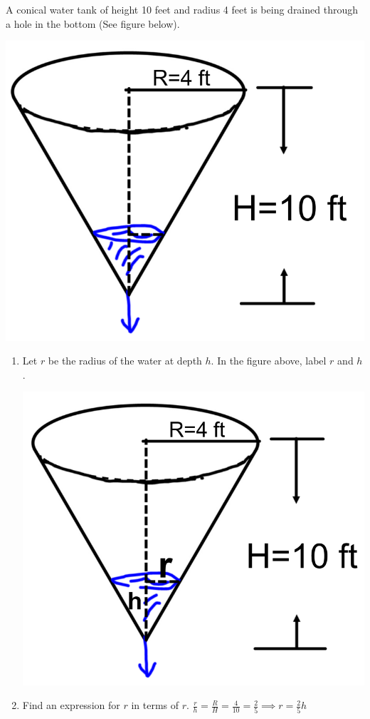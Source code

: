 \documentclass[nooutcomes]{ximera}
\begin{document}
\begin{problem}
A conical water tank of height 10 feet and radius 4 feet is being drained through a hole in the bottom (See figure below).   
		\begin{image}
		\includegraphics[scale=.4]{Figure14.png}
		\end{image}

\begin{enumerate}
	\item Let $r$ be the radius of the water at depth $h$.  In the figure above, label $r$ and $h$.
		\begin{freeResponse} \hfil
		\begin{image}
		\includegraphics[scale=.3]{Figure15.png}
		\end{image}
		\end{freeResponse}	
	\item Find an expression for $r$ in terms of $r$.
	$\frac{r}{h}=\frac{R}{H}=\frac{4}{10}=\frac{2}{5} \implies r=\frac{2}{5}h$
	

\end{enumerate}
\end{problem}
\end{document}
